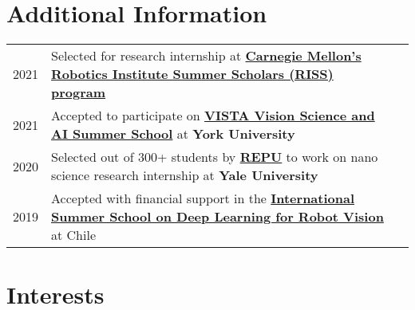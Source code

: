 \documentclass[]{resume-openfont}
\begin{document}
\begin{minipage}[t]{0.95\linewidth}
\section{Additional Information} 
\begin{tabular}{rll}
2021	     & Selected for research internship at \href{https://riss.ri.cmu.edu/}{ \textbf{Carnegie Mellon’s Robotics Institute Summer Scholars (RISS) program}}  \\
2021	     & Accepted to participate on \href{https://www.yorku.ca/cvr/summer-school/}{\textbf{VISTA Vision Science and AI Summer School}} at \textbf{York University} \\
2020	     & Selected out of 300+ students by \href{https://www.repuprogram.org/}{\textbf{REPU}} to work on nano science research internship at \textbf{Yale University}  \\
2019	     & Accepted with financial support in the \href{http://robotvision2019.amtc.cl/}{\textbf{International Summer School on Deep Learning for Robot Vision}} at Chile \\
\end{tabular}

\section{Interests}
\end{minipage} 
\end{document}
